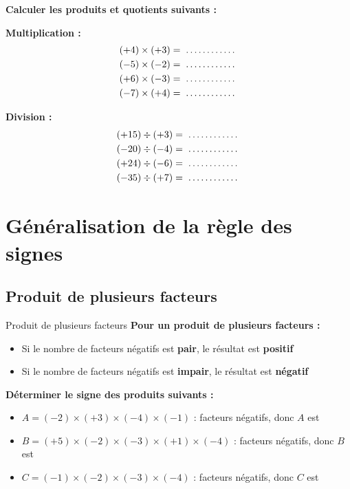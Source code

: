 \begin{examplebox}
\textbf{Calculer les produits et quotients suivants :}

\begin{minipage}[t]{0.48\textwidth}
\textbf{Multiplication :}
\begin{align*}
(+4) \times (+3) &= \trous{2cm} \\
(-5) \times (-2) &= \trous{2cm} \\
(+6) \times (-3) &= \trous{2cm} \\
(-7) \times (+4) &= \trous{2cm}
\end{align*}
\end{minipage}
\hfill
\begin{minipage}[t]{0.48\textwidth}
\textbf{Division :}
\begin{align*}
(+15) \div (+3) &= \trous{2cm} \\
(-20) \div (-4) &= \trous{2cm} \\
(+24) \div (-6) &= \trous{2cm} \\
(-35) \div (+7) &= \trous{2cm}
\end{align*}
\end{minipage}
\end{examplebox}

\section{Généralisation de la règle des signes}

\subsection{Produit de plusieurs facteurs}

\begin{proprietebox}{Produit de plusieurs facteurs}
\textbf{Pour un produit de plusieurs facteurs :}
\begin{itemize}[label = \textbullet]
\item Si le nombre de facteurs négatifs est \textbf{pair}, le résultat est \textbf{positif}
\item Si le nombre de facteurs négatifs est \textbf{impair}, le résultat est \textbf{négatif}
\end{itemize}
\end{proprietebox}

\begin{examplebox}
\textbf{Déterminer le signe des produits suivants :}
\begin{itemize}[label = \textbullet]
\item $A = (-2) \times (+3) \times (-4) \times (-1)$ : \trous{2.5cm} facteurs négatifs, donc $A$ est \trous{2cm}
\item $B = (+5) \times (-2) \times (-3) \times (+1) \times (-4)$ : \trous{2.5cm} facteurs négatifs, donc $B$ est \trous{2cm}
\item $C = (-1) \times (-2) \times (-3) \times (-4)$ : \trous{2.5cm} facteurs négatifs, donc $C$ est \trous{2cm}
\end{itemize}
\end{examplebox}

